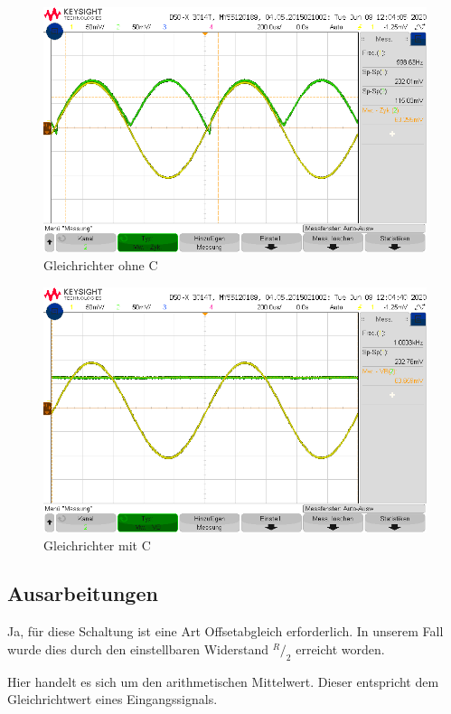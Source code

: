 \begin{figure}[H]
    \centering
    \includegraphics[width=\costumPicWidth]{Lab_3/Messungen/scope_1.png}
    \caption{Gleichrichter ohne C}
    \label{fig:res_gleichrichter_ohne_C}
\end{figure}
\begin{figure}[H]
    \centering
    \includegraphics[width=\costumPicWidth]{Lab_3/Messungen/scope_2.png}
    \caption{Gleichrichter mit C}
    \label{fig:res_gleichrichter_mit_C}
\end{figure}
\subsection{Ausarbeitungen}
Ja, für diese Schaltung ist eine Art Offsetabgleich erforderlich. In unserem Fall wurde dies durch den einstellbaren Widerstand $^R/_2$ erreicht worden.

Hier handelt es sich um den arithmetischen Mittelwert. Dieser entspricht dem Gleichrichtwert eines Eingangssignals.

